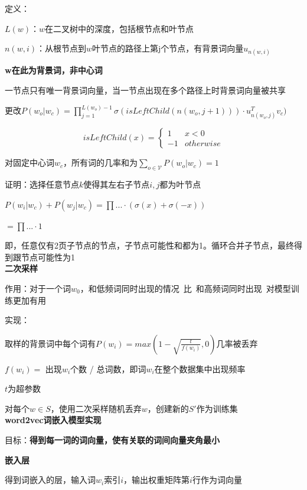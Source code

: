 \documentclass[UTF8]{ctexart}
\begin{document}
  \quad 定义：

  \quad \quad $L(w)$：$w$在二叉树中的深度，包括根节点和叶节点

  \quad \quad $n(w, i)$：从根节点到$w$叶节点的路径上第j个节点，有背景词向量$u_{n(w, i)}$

  \quad \quad \quad \textbf{w在此为背景词，非中心词}

  \quad \quad \quad 一节点只有唯一背景词向量，当一节点出现在多个路径上时背景词向量被共享

  \quad 更改$P(w_o | w_c) = \prod_{j=1}^{L(w_o) - 1} \sigma(isLeftChild(n(w_o, j+1))) \cdot u_{n(w_o, j)}^Tv_c)$

  \quad \quad \begin{equation*}
    isLeftChild(x) = \begin{cases}
    1 &x < 0\\
    -1 & otherwise
    \end{cases}
  \end{equation*}

  \quad \quad 对固定中心词$w_c$，所有词的几率和为$\sum_{o \in \mathcal{V}} P(w_o | w_c) = 1$

  \quad \quad \quad 证明：选择任意节点$k$使得其左右子节点$i, j$都为叶节点

  \quad \quad \quad \quad $P(w_i | w_c) + P(w_j | w_c) = \prod ... \cdot (\sigma(x) + \sigma(-x))$

  \quad \quad \quad \quad $ = \prod ... \cdot 1$

  \quad \quad \quad \quad 即，任意仅有2页子节点的节点，子节点可能性和都为1。循环合并子节点，最终得到跟节点可能性为1\\
\textbf{二次采样}

  作用：对于一个词$w_0$，和低频词同时出现的情况\ 比\ 和高频词同时出现\ 对模型训练更加有用

  实现：
  
  \quad 取样的背景词中每个词有$P(w_i) = max(1-\sqrt{\frac{t}{f(w_i)}}, 0)$几率被丢弃

  \quad \quad $f(w_i) = $ 出现$w_i$个数 / 总词数，即词$w_i$在整个数据集中出现频率

  \quad \quad $t$为超参数

  \quad 对每个$w \in S$，使用二次采样随机丢弃$w$，创建新的$S'$作为训练集\\
\textbf{word2vec词嵌入模型实现}

  目标：\textbf{得到每一词的词向量，使有关联的词间向量夹角最小}

  \textbf{嵌入层}

  \quad 得到词嵌入的层，输入词$w_i$索引$i$，输出权重矩阵第$i$行作为词向量
\end{document}

